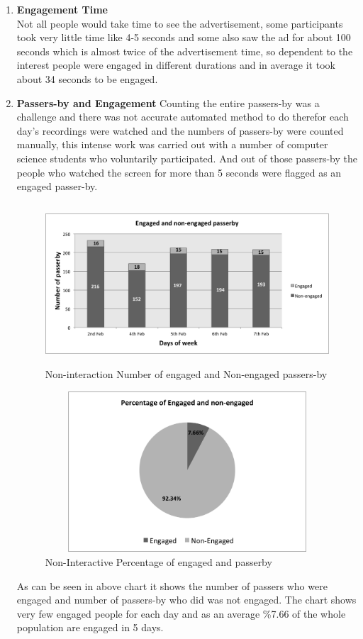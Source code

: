 \begin{enumerate}
\item \textbf{Engagement Time} \\
Not all people would take time to see the advertisement, some participants took very little time like 4-5 seconds and some also saw the ad for about 100 seconds which is almost twice of the advertisement time, so dependent to the interest people were engaged in different durations and in average it took about 34 seconds to be engaged.


\item \textbf{Passers-by and Engagement}
Counting the entire passers-by was a challenge and there was not accurate automated method to do therefor each day’s recordings were watched and the numbers of passers-by were counted manually, this intense work was carried out with a number of computer science students who voluntarily participated.  
And out of those passers-by the people who watched the screen for more than 5 seconds were flagged as an engaged passer-by.


\begin{figure}[H]
    \centering
    \includegraphics[width=110mm,height=60mm]{Figures/8/non_inter_findings/non_inter_engage_day}
    \caption{Non-interaction Number of engaged and Non-engaged passers-by}%
    \label{fig:Nonengagedandengagedby}%
\end{figure}

\begin{figure}[H]
    \centering
    \includegraphics[width=110mm,height=60mm]{Figures/8/non_inter_findings/non_eng_percentage}
    \caption{Non-Interactive Percentage of engaged and passerby}%
    \label{fig:Nonengagedpasserbypercentage}%
\end{figure}


As can be seen in above chart it shows the number of passers who were engaged and number of passers-by who did was not engaged. The chart shows very few engaged people for each day and as an average \%7.66 of the whole population are engaged in 5 days.

\end{enumerate}


